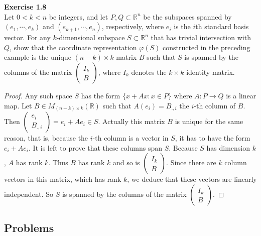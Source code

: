 \documentclass[12pt, a4paper]{article}
\theoremstyle{plain}
\newcommand{\R}{\mathbb{R}}
\def\phi{\varphi}
\newenvironment{exercise}[2][Exercise]
    { \begin{mdframed}[backgroundcolor=gray!20] \textbf{#1 #2} \\}
    {  \end{mdframed}}
\begin{document}
\begin{exercise}{1.8}
    Let $0<k<n$ be integers, and let $P,Q\subset \R^n$ be the subspaces spanned by $(e_1,\cdots,e_k)$ and $(e_{k+1},\cdots,e_n)$, respectively, where $e_i$ is the $i$th standard basis vector. For any $k$-dimensional subspace $S\subset\R^n$ that has trivial intersection with $Q$, show that the coordinate representation $\phi(S)$ constructed in the preceding example is the unique $(n-k)\times k$ matrix $B$ such that $S$ is spanned by the columns of the matrix $\begin{pmatrix}
        I_k\\
        B
    \end{pmatrix}$, where $I_k$ denotes the $k\times k$ identity matrix.
\end{exercise}
    \begin{proof}
        Any such space $S$ has the form $\{x+Ax\colon x\in P\}$ where $A\colon P\to Q$ is a linear map. Let $B\in M_{(n-k)\times k}(\R)$ such that $A(e_i)=B_{.,i}$ the $i$-th column of $B$. Then $\begin{pmatrix}
            e_i\\
            B_{.,i}
        \end{pmatrix}=e_i+Ae_i\in S$. Actually this matrix $B$ is unique for the same reason, that is, because the $i$-th column is a vector in $S$, it has to have the form $e_i+Ae_i$. It is left to prove that these columns span $S$. Because $S$ has dimension $k$, $A$ has rank $k$. Thus $B$ has rank $k$ and so is $\begin{pmatrix}
            I_k\\
            B
        \end{pmatrix}.$ Since there are $k$ column vectors in this matrix, which has rank $k$, we deduce that these vectors are linearly independent. So $S$ is spanned by the columns of the matrix $\begin{pmatrix}
            I_k\\
            B
        \end{pmatrix}.$
    \end{proof}


\subsection{Problems}
\end{document}
